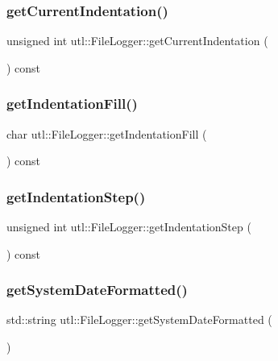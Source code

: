\subsubsection{\texorpdfstring{get\+Current\+Indentation()}{getCurrentIndentation()}}
{\footnotesize\ttfamily unsigned int utl\+::\+File\+Logger\+::get\+Current\+Indentation (\begin{DoxyParamCaption}{ }\end{DoxyParamCaption}) const}

\mbox{\label{classutl_1_1_file_logger_a2c0041e83ed565fe78e6ef23d528a876}} 
\subsubsection{\texorpdfstring{get\+Indentation\+Fill()}{getIndentationFill()}}
{\footnotesize\ttfamily char utl\+::\+File\+Logger\+::get\+Indentation\+Fill (\begin{DoxyParamCaption}{ }\end{DoxyParamCaption}) const}

\mbox{\label{classutl_1_1_file_logger_a3193fb78297f90dfc58c12e2d95d9024}} 
\subsubsection{\texorpdfstring{get\+Indentation\+Step()}{getIndentationStep()}}
{\footnotesize\ttfamily unsigned int utl\+::\+File\+Logger\+::get\+Indentation\+Step (\begin{DoxyParamCaption}{ }\end{DoxyParamCaption}) const}

\mbox{\label{classutl_1_1_file_logger_a5bad9892d678f01ae8d1d98c9a9f4ac6}} 
\subsubsection{\texorpdfstring{get\+System\+Date\+Formatted()}{getSystemDateFormatted()}\hspace{0.1cm}{\footnotesize\ttfamily [1/2]}}
{\footnotesize\ttfamily std\+::string utl\+::\+File\+Logger\+::get\+System\+Date\+Formatted (\begin{DoxyParamCaption}{ }\end{DoxyParamCaption})\hspace{0.3cm}{\ttfamily [static]}}

